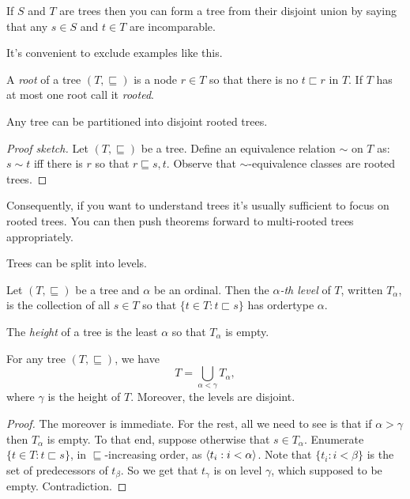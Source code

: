 \documentclass[10pt]{amsart}
\begin{document}
\begin{example}
If $S$ and $T$ are trees then you can form a tree from their disjoint union by saying that any $s \in S$ and $t \in T$ are incomparable.
\end{example}

It's convenient to exclude examples like this.

\begin{definition}
A \emph{root} of a tree $(T,\sqsubseteq)$ is a node $r \in T$ so that there is no $t \sqsubset r$ in $T$. If $T$ has at most one root call it \emph{rooted}.
\end{definition}

\begin{observation}
Any tree can be partitioned into disjoint rooted trees.
\end{observation}

\begin{proof}[Proof sketch]
Let $(T,\sqsubseteq)$ be a tree. Define an equivalence relation $\sim$ on $T$ as: $s \sim t$ iff there is $r$ so that $r \sqsubseteq s, t$. Observe that $\sim$-equivalence classes are rooted trees.
\end{proof}

Consequently, if you want to understand trees it's usually sufficient to focus on rooted trees. You can then push theorems forward to multi-rooted trees appropriately.
\smallskip

Trees can be split into levels.

\begin{definition}
Let $(T,\sqsubseteq)$ be a tree and $\alpha$ be an ordinal. Then the \emph{$\alpha$-th level} of $T$, written $T_\alpha$, is the collection of all $s \in T$ so that $\{ t \in T : t \sqsubset s \}$ has ordertype $\alpha$.
\end{definition}

\begin{definition}
The \emph{height} of a tree is the least $\alpha$ so that $T_\alpha$ is empty. 
\end{definition}

\begin{proposition}
For any tree $(T,\sqsubseteq)$, we have
\[
T = \bigcup_{\alpha < \gamma} T_\alpha,
\]
where $\gamma$ is the height of $T$. Moreover, the levels are disjoint.
\end{proposition}

\begin{proof}
The moreover is immediate. For the rest, all we need to see is that if $\alpha > \gamma$ then $T_\alpha$ is empty. To that end, suppose otherwise that $s \in T_\alpha$. Enumerate $\{ t \in T : t \sqsubset s \}$, in $\sqsubseteq$-increasing order, as ${\left\langle t_i : i < \alpha \right\rangle}$. Note that $\{ t_i : i < \beta \}$ is the set of predecessors of $t_\beta$. So we get that $t_\gamma$ is on level $\gamma$, which supposed to be empty. Contradiction.
\end{proof}
\end{document}
